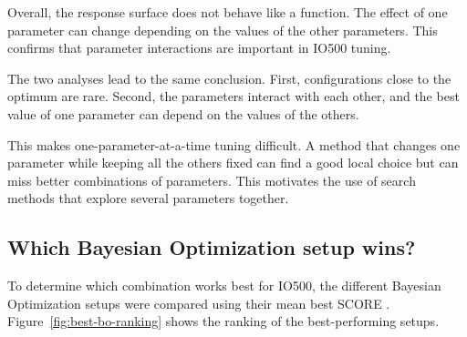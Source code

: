 Overall, the response surface does not behave like a  function. The effect of one parameter can change depending on
the values of the other parameters. This confirms that parameter
interactions are important in IO500 tuning.



The two analyses lead to the same conclusion. First, configurations close
to the optimum are rare. Second, the parameters interact with each other,
and the best value of one parameter can depend on the values of the
others.

This makes one-parameter-at-a-time tuning difficult. A method that changes
one parameter while keeping all the others fixed can find a good local
choice but can miss better combinations of parameters. This motivates
the use of search methods that explore several parameters together.

\subsection{Which Bayesian Optimization setup wins?}
To determine which combination works best for IO500, the different
Bayesian Optimization setups were compared using their mean best SCORE . Figure~\ref{fig:best-bo-ranking} shows the ranking of the
best-performing setups. 

